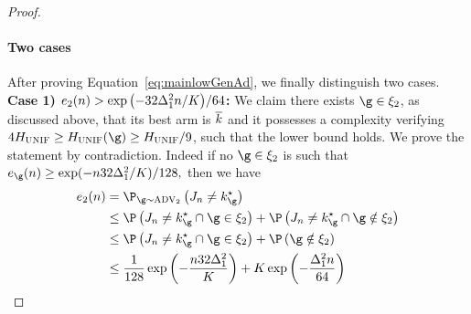 \begin{proof}
\paragraph{Two cases}
After proving Equation~\ref{eq:mainlowGenAd}, we	finally 
	 distinguish two cases. \\
	\noindent\textbf{Case 1) $e_{2}(n)>
		\exp\left(-32\Delta^2_{1}n/K\right)\!/64$:}
%	
		We claim  there exists $\gainVector\in\eventc_2$,  
	as discussed above,  that its best arm is  $\overline k$ and it 
	possesses a complexity verifying $4\complexityUnif\geq\complexityUnif(\gainVector)\geq \complexityUnif/9$,  
	such that the lower bound holds. We prove the statement by contradiction.
	Indeed if no $\gainVector\in\eventc_2$ is such that 
$
\ProErr_{\gainVector}(n)
	\geq
	 \exp( -\timeHorizon32\gap^2_1 /\nArms)/128,
$	then we have 
	\begin{align*}
	\ProErr_{2}(\timeHorizon)
&=
\Pro_{\gainVector\sim \advPro_2}\left(\recomArm_n \neq \bestArm_{\gainVector}\right)\\
&\leq
\Pro\left(\recomArm_n \neq \bestArm_{\gainVector}\cap\gainVector\in\eventc_2\right)
+
\Pro\left(\recomArm_n \neq \bestArm_{\gainVector}\cap\gainVector\notin\eventc_2\right)\\
&\leq
\Pro\left(\recomArm_n \neq \bestArm_{\gainVector}\cap\gainVector\in\eventc_2\right)
+
\Pro\left(\gainVector\notin\eventc_2\right)\\
&\leq
 \frac{1}{128}\exp\left( -\frac{\timeHorizon32\gap^2_1 }{\nArms}\right)
+
\nArms\exp\left(-\frac{\gap^2_1\timeHorizon}{64}\right)\\

\end{align*}
\end{proof}
